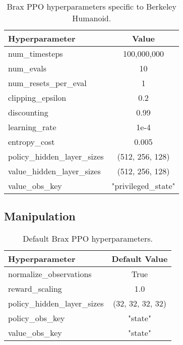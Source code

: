 \begin{table}[ht]
\centering
\begin{tabular}{|l|c|} 
\hline
\textbf{Hyperparameter} & \textbf{Value} \\ \hline
num\_timesteps & 100,000,000 \\ \hline
num\_evals & 10  \\ \hline
num\_resets\_per\_eval & 1 \\ \hline
clipping\_epsilon & 0.2 \\ \hline
discounting & 0.99 \\ \hline
learning\_rate & 1e-4 \\ \hline
entropy\_cost & 0.005 \\ \hline
policy\_hidden\_layer\_sizes & (512, 256, 128) \\ \hline 
value\_hidden\_layer\_sizes & (512, 256, 128) \\ \hline 
value\_obs\_key & "privileged\_state" \\ \hline
\end{tabular}
\caption{Brax PPO hyperparameters specific to Berkeley Humanoid.}
\end{table}

\clearpage

\subsection{Manipulation}

\begin{table}[ht]
\centering
\begin{tabular}{|l|c|} 
\hline
\textbf{Hyperparameter} & \textbf{Default Value} \\ \hline
normalize\_observations & True \\ \hline
reward\_scaling & 1.0 \\ \hline
policy\_hidden\_layer\_sizes & (32, 32, 32, 32) \\ \hline 
policy\_obs\_key & "state" \\ \hline
value\_obs\_key & "state" \\ \hline
\end{tabular}
\caption{Default Brax PPO hyperparameters.}
\end{table}

